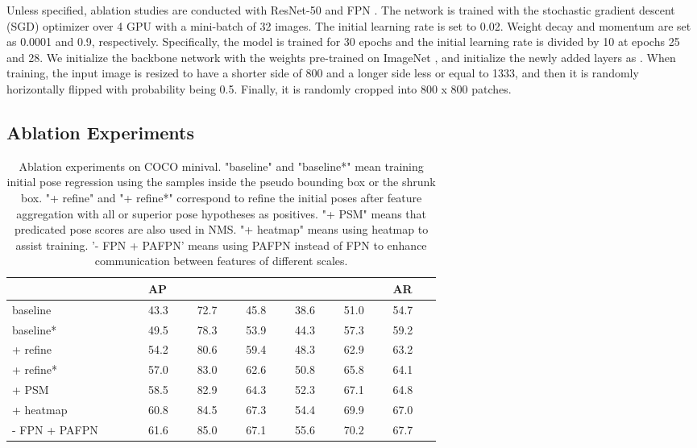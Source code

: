 \documentclass[11pt,twocolumn,journal]{IEEEtran}
\begin{document}
Unless specified, ablation studies are conducted with ResNet-50 \cite{he2016deep} and FPN \cite{fpn17}. The network is trained with the stochastic gradient descent (SGD) optimizer over 4 GPU with a mini-batch of 32 images. The initial learning rate is set to 0.02. Weight decay and momentum are set as 0.0001 and 0.9, respectively. Specifically, the model is trained for 30 epochs and the initial learning rate is divided by 10 at epochs 25 and 28. We initialize the backbone network with the weights pre-trained on ImageNet \cite{deng2009imagenet}, and initialize the newly added layers as \cite{lin2017focal}. When training, the input image is resized to have a shorter side of 800 and a longer side less or equal to 1333, and then it is randomly horizontally flipped with probability being 0.5. Finally, it is randomly cropped into 800 x 800 patches. 



\subsection{Ablation Experiments}
\begin{table}[t]
\centering
\begin{tabular}{p{0.2\linewidth}p{0.07\linewidth}p{0.07\linewidth} p{0.07\linewidth}p{0.07\linewidth} p{0.07\linewidth}p{0.07\linewidth}}
\toprule
 & AP &  &  &  &  & AR \\
\midrule
baseline & 43.3 & 72.7 & 45.8 & 38.6 & 51.0 & 54.7\\
baseline* & 49.5 & 78.3 & 53.9 & 44.3 & 57.3 & 59.2\\
+ refine & 54.2 & 80.6 & 59.4 & 48.3 & 62.9 & 63.2\\
+ refine* & 57.0 & 83.0 & 62.6 & 50.8 & 65.8 & 64.1\\
+ PSM & 58.5 & 82.9 & 64.3 & 52.3 & 67.1 & 64.8\\
+ heatmap & 60.8 & 84.5 & 67.3 & 54.4 & 69.9 & 67.0\\
\scriptsize - FPN + PAFPN  & 61.6 & 85.0 & 67.1 & 55.6 & 70.2 & 67.7\\
\bottomrule
\end{tabular}
\caption{Ablation experiments on COCO minival. "baseline" and "baseline*" mean training initial pose regression using the samples inside the pseudo bounding box or the shrunk box. 
"+ refine" and "+ refine*" correspond to refine the initial poses after feature aggregation with all or superior pose hypotheses as positives.
"+ PSM" means that predicated pose scores are also used in NMS. 
"+ heatmap" means using heatmap to assist training. 
'- FPN + PAFPN' means using PAFPN instead of FPN to enhance communication between features of different scales.}
\setlength{\belowdisplayskip}{0pt}
\label{tab_ablation}
\end{table}
\end{document}
